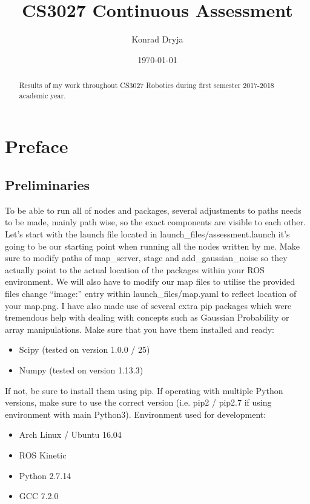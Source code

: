 \documentclass[a4paper]{article}
\title{CS3027 Continuous Assessment}
\author{Konrad Dryja}
\date{\today}
\begin{document}
\maketitle

\begin{abstract}
Results of my work throughout CS3027 Robotics during first semester 2017-2018 academic year.
\end{abstract}

\section{Preface}
\label{sec:Preliminaries}
\subsection{Preliminaries}

To be able to run all of nodes and packages, several adjustments to paths needs to be made, mainly path wise, so the exact components are visible to each other.
Let's start with the launch file located in launch\_files/assessment.launch \textendash{} it's going to be our starting point when running all the nodes written by me. Make sure to modify paths of map\_server, stage and add\_gaussian\_noise so they actually point to the actual location of the packages within your ROS environment. We will also have to modify our map files to utilise the provided files \textendash{} change \textquotedblleft{}image:\textquotedblright{} entry within launch\_files/map.yaml to reflect location of your map.png.
I have also made use of several extra pip packages which were tremendous help with dealing with concepts such as Gaussian Probability or array manipulations. Make sure that you have them installed and ready:
\begin{itemize}
    \setlength\itemsep{0.1em}
    \item Scipy (tested on version 1.0.0 / 25)
    \item Numpy (tested on version 1.13.3)
\end{itemize}
If not, be sure to install them using pip. If operating with multiple Python versions, make sure to use the correct version (i.e. pip2 / pip2.7 if using environment with main Python3). 
Environment used for development:
\begin{itemize}
    \setlength\itemsep{0.1em}
    \item Arch Linux / Ubuntu 16.04
    \item ROS Kinetic
    \item Python 2.7.14
    \item GCC 7.2.0
\end{itemize}
\end{document}
